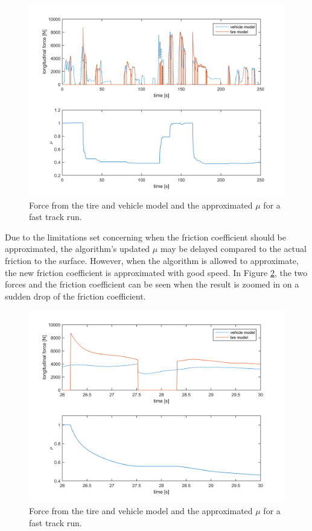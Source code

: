 \begin{figure}[h]
	\centering
	\includegraphics[width=1.0\textwidth]{Pictures/force_mue_comb2}
	\caption {Force from the tire and vehicle model and the approximated $ \mu $ for a fast track run.}
	\label{force_mue_comb2}
\end{figure}

Due to the limitations set concerning when the friction coefficient should be approximated, the algorithm's updated $ \mu $ may be delayed compared to the actual friction to the surface. However, when the algorithm is allowed to approximate, the new friction coefficient is approximated with good speed. In Figure \ref{force_mue_comb2_zoom}, the two forces and the friction coefficient can be seen when the result is zoomed in on a sudden drop of the friction coefficient. 

\begin{figure}[h]
	\centering
	\includegraphics[width=1.0\textwidth]{Pictures/force_mue_comb2_zoom}
	\caption {Force from the tire and vehicle model and the approximated $ \mu $ for a fast track run.}
	\label{force_mue_comb2_zoom}
\end{figure}

